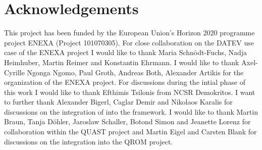 \chapter{Acknowledgements}

This project has been funded by the European Union's Horizon 2020 programme project ENEXA (Project 101070305).
For close collaboration on the DATEV use case of the ENEXA project I would like to thank Maria Schnödt-Fuchs, Nadja Heimhuber, Martin Reimer and Konstantin Ehrmann.
I would like to thank Axel-Cyrille Ngonga Ngomo, Paul Groth, Andreas Both, Alexander Artikis for the organization of the ENEXA project.
For discussions during the intial phase of this work I would like to thank Efthimis Tsilonis from NCSR Demokritos.
I want to further thank Alexander Bigerl, Caglar Demir and Nikolaos Karalis for discussions on the integration of  into the \tnreason framework.
I would like to thank Martin Braun, Tanja Döhler, Jaroslaw Schaller, Botond Simon and Jeanette Lorenz for collaboration within the QUAST project and
Martin Eigel and Carsten Blank for discussions on the integration into the QROM project.
